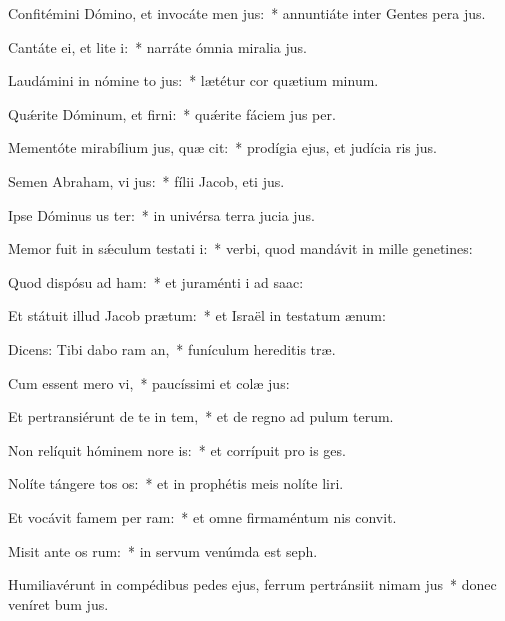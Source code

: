 \item Confitémini Dómino, et invocáte men jus:~* annuntiáte inter Gentes pera jus.
\item Cantáte ei, et lite i:~* narráte ómnia miralia jus.
\item Laudámini in nómine to jus:~* lætétur cor quætium minum.
\item Quǽrite Dóminum, et firni:~* quǽrite fáciem jus per.
\item Mementóte mirabílium jus, quæ cit:~* prodígia ejus, et judícia ris jus.
\item Semen Abraham, vi jus:~* fílii Jacob, eti jus.
\item Ipse Dóminus us ter:~* in univérsa terra jucia jus.
\item Memor fuit in sǽculum testati i:~* verbi, quod mandávit in mille genetines:
\item Quod dispósu ad ham:~* et juraménti i ad saac:
\item Et státuit illud Jacob  prætum:~* et Israël in testatum ænum:
\item Dicens: Tibi dabo ram an,~* funículum hereditis træ.
\item Cum essent mero vi,~* paucíssimi et colæ jus:
\item Et pertransiérunt de te in tem,~* et de regno ad pulum terum.
\item Non relíquit hóminem nore is:~* et corrípuit pro is ges.
\item Nolíte tángere tos os:~* et in prophétis meis nolíte liri.
\item Et vocávit famem per ram:~* et omne firmaméntum nis convit.
\item Misit ante os rum:~* in servum venúmda est seph.
\item Humiliavérunt in compédibus pedes ejus, ferrum pertránsiit nimam jus~* donec veníret bum jus.
